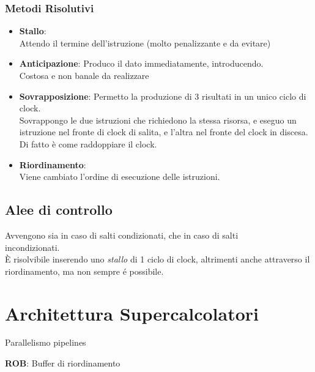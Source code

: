 \documentclass[a4paper,10pt]{article}
\begin{document}
\subsubsection{Metodi Risolutivi}
\begin{itemize}
    \item \textbf{Stallo}:
        \\
        Attendo il termine dell'istruzione (molto penalizzante e da evitare)
    \item \textbf{Anticipazione}:
        Produco il dato immediatamente, introducendo.
        \\
        Costosa e non banale da realizzare
    \item \textbf{Sovrapposizione}:
        Permetto la produzione di 3 risultati in un unico ciclo di clock.
        \\
        Sovrappongo le due istruzioni che richiedono la stessa risorsa, e eseguo un istruzione nel fronte di clock di salita,
        e l'altra nel fronte del clock in discesa.
        \\
        Di fatto è come raddoppiare il clock.

    \item \textbf{Riordinamento}:
        \\
        Viene cambiato l'ordine di esecuzione delle istruzioni.

\end{itemize}

\subsection{Alee di controllo}
Avvengono sia in caso di salti condizionati, che in caso di salti\\ incondizionati.
\\
È risolvibile inserendo uno \textit{stallo} di 1 ciclo di clock, altrimenti anche attraverso il riordinamento, ma non sempre é possibile.


\section{Architettura Supercalcolatori}
Parallelismo pipelines

\textbf{ROB}: Buffer di riordinamento







\newpage
\tableofcontents{}
\end{document}
